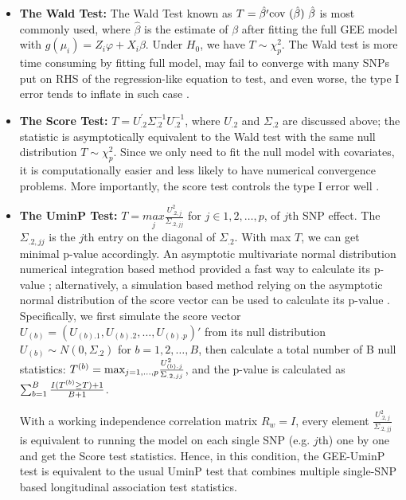 \documentclass[12pt]{article}
\begin{document}
\begin{itemize}
\item \textbf{The Wald Test:} The Wald Test known as $T=\hat{\beta'}\text{cov (\ensuremath{\hat{\beta}}) }\hat{\beta}$ is most commonly used, where $\hat{\beta}$ is the estimate of $\beta$ after fitting the full GEE model with $g(\mu_i) = Z_i\varphi + X_i \beta$. Under $H_0$, we have $T \sim \chi_{p}^2$. The Wald test is more time consuming by fitting full model, may fail to converge with many SNPs put on RHS of the regression-like equation to test, and even worse, the type I error tends to inflate in such case \cite{pan2014powerful,zhang2014testing}.
\item \textbf{The Score Test:} $T=U_{.2}^{'}\Sigma_{.2}^{-1}U_{.2}^{-1}$, where $U_{.2}$ and $\Sigma_{.2}$ are discussed above; the statistic is asymptotically equivalent to the Wald test with the same null distribution $T \sim \chi_{p}^2$. Since we only need to fit the null model with covariates, it is computationally easier and less likely to have numerical convergence
problems. More importantly, the score test controls the type I error well \cite{pan2014powerful,zhang2014testing}.
\item \textbf{The UminP Test: }$T=\underset{j}{max}\frac{U_{.2,j}^{2}}{\Sigma_{.2,jj}}$
for $j\in 1,2,\dots,p$, of $j$th SNP effect. The $\Sigma_{.2,jj}$ is the $j$th entry on the diagonal of $\Sigma_{.2}$. With max $T$, we can get minimal p-value accordingly. An asymptotic multivariate normal distribution numerical integration based method provided a fast way to calculate its p-value \cite{Pan2009a,Pan2009}; alternatively, a simulation based method relying on the asymptotic normal distribution of the score vector can be used to calculate its p-value \cite{pan2014powerful,zhang2014testing}. Specifically, we first simulate the score vector $U_{(b)} = ( U_{(b).1}, U_{(b).2},\ldots, U_{(b).p} )'$ from its null distribution  $U_{(b)} \sim N(0, \Sigma_{.2} )$ for $b = 1, 2, \ldots, B$, then calculate a total number of B null statistics: $T^{(b)} = \textrm{max}_{j = 1,\ldots,p} { U^2_{(b).j} \over  \Sigma_{.2,jj} }$, and the p-value is calculated as $\sum_{b=1}^B { I(T^{(b)} \geq T ) + 1  \over B + 1 } $.

With a working independence correlation matrix $R_w = I$, every element $\frac{U_{.2,j}^{2}}{\Sigma_{.2,jj}}$ is equivalent to running the model on each single SNP (e.g. $j$th) one by one and get the Score test statistics. Hence, in this condition, the GEE-UminP test is equivalent to the usual UminP test that combines multiple single-SNP based longitudinal association test statistics.
\end{itemize}
\end{document}
